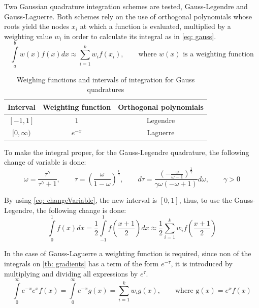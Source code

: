 		Two Gaussian quadrature integration schemes are tested, Gauss-Legendre and Gauss-Laguerre. Both schemes rely on the use of orthogonal polynomials whose roots yield the nodes $x_i$ at which a function is evaluated, multiplied by a weighting value $w_i$ in order to calculate its integral as in \autoref{eq: gauss}.
		\begin{equation}\label{eq: gauss}
			\int\limits_{a}^{b} w(x)f(x)dx \approx \sum_{i = 1}^{k}w_i f(x_i), \qquad \text{where $w(x)$ is a weighting function}
		\end{equation}
		
		\begin{table}[h]
			\centering
			\caption{Weighing functions and intervals of integration for Gauss quadratures}
			\begin{tabular}{ccc}
				\hline
				\textbf{Interval} & \textbf{Weighting function} & \textbf{Orthogonal polynomials} \\
				\hline
				$[-1, 1]$ & $1$ & Legendre \\
				$[0, \infty)$ & $e^{-x}$ & Laguerre \\
				\hline
			\end{tabular}
		\end{table}
		
		To make the integral proper, for the Gauss-Legendre quadrature, the following change of variable is done:
		\begin{equation}\label{eq: changeVariable}
			\omega = \dfrac{\tau^\gamma}{\tau^\gamma + 1}, \qquad \tau = \left(\frac{\omega}{1-\omega}\right)^{\frac{1}{\gamma}}, \qquad d\tau = \dfrac{\left(- \frac{\omega}{\omega - 1}\right)^{\frac{1}{\gamma}}}{\gamma \omega \left(- \omega + 1\right)} d\omega, \qquad \gamma > 0
		\end{equation} 
		
		By using \autoref{eq: changeVariable}, the new interval is $[0, 1]$, thus, to use the Gauss-Legendre, the following change is done:
		\begin{equation}
			\int\limits_{0}^{1}f(x)dx = \dfrac{1}{2}\int\limits_{-1}^{1}f\left(\dfrac{x + 1}{2}\right)dx \approx \dfrac{1}{2}\sum_{i = 1}^{k}w_if\left(\dfrac{x + 1}{2}\right)
		\end{equation}
		
		In the case of Gauss-Laguerre a weighting function is required, since non of the integrals on \autoref{tb: gradients} has a term of the form $e^{-\tau}$, it is introduced by multiplying and dividing all expressions by $e^{\tau}$.
		\begin{equation}
			\int\limits_{0}^{\infty}e^{-x}e^{x}f(x) = \int\limits_{0}^{\infty}e^{-x}g(x) = \sum_{i = 1}^{k}w_i g(x), \qquad \text{where g$(x) = e^xf(x)$}
		\end{equation}
		
